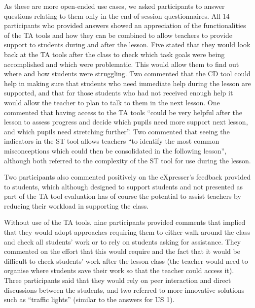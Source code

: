 {{{{{{As these are more open-ended use cases, we asked participants to
answer questions relating to them only in the end-of-session questionnaires. 
All 14 participants who provided answers showed 
an appreciation of the functionalities of the TA tools and 
how they can be combined to allow teachers to provide support 
to students during and after the lesson. 
Five stated that they would look back at the TA tools 
after the class to check which task goals were being accomplished 
and which were problematic. 
This would allow them to find out where and how students were struggling.
Two commented that the CD tool could help in making sure
that students who need immediate help during the lesson are 
supported, and that for those students who had not received enough 
help it would allow the teacher to plan to talk to them in the next lesson.
One commented that having access to the TA tools 
``could be very helpful after the lesson to assess progress and
decide which pupils need more support next lesson,
and which pupils need stretching further''. 
Two commented that seeing the
indicators in the ST tool allows teachers
``to identify the most common misconceptions which could then be
consolidated in the following lesson'', although both referred to the
complexity of the ST tool for use during the lesson.

Two participants also commented positively on the eXpresser's feedback 
provided to students, which although designed to support students
and not presented as part of the TA tool evaluation has of course
the potential to assist teachers by reducing their workload in supporting
the class.
%

Without use of the TA tools, nine participants provided comments 
that implied that they would adopt approaches requiring them
to either walk around the class and check all students' work or to rely on
students asking for assistance. They commented on the effort that this
would require and the fact that it would be difficult to check students'
work after the lesson class (the teacher would need to organise where students 
save their work so that the teacher could access it). 
Three participants said that they would rely on peer interaction and direct 
discussions between the students, and two referred to more innovative solutions 
such as ``traffic lights'' (similar to the answers for US 1).
 
}}}}}}
